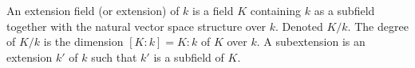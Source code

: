 An extension field (or extension) of $k$ is a field $K$ containing $k$ as a subfield together with the natural vector space structure over $k$. Denoted $K/k$. The degree of $K/k$ is the dimension $[K:k] = K:k$ of $K$ over $k$. A subextension is an extension $k'$ of $k$ such that $k'$ is a subfield of $K$.
